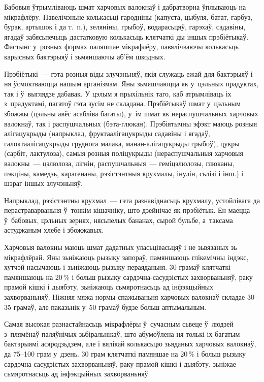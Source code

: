 Бабовыя ўтрымліваюць шмат харчовых валокнаў і дабратворна ўплываюць на мікрафлёру. Павелічэньне колькасьці гародніны (капуста, цыбуля, батат, гарбуз, бурак, артышок і да т.~п.), зеляніны, грыбоў, водарасьцяў, гарэхаў, садавіны, ягадаў забясьпечыць дастатковую колькасьць клятчаткі ды іншых прэбіётыкаў. Фастынг у~розных формах паляпшае мікрафлёру, павялічваючы колькасьць карысных бактэрыяў і зьмяншаючы аб'ём шкодных.

Прэбіётыкі~--- гэта розныя віды злучэньняў, якія служаць ежай для бактэрыяў і ня ўсмоктваюцца нашым арганізмам. Яны зьмяшчаюцца як у~цэльных прадуктах, так і ў~выглядзе дабавак. У цэлым я прыхільнік таго, каб атрымліваць іх з~прадуктамі, пагатоў гэта зусім не складана. Прэбіётыкаў шмат у~цэльным збожжы (цэльны авёс асабліва багаты), у~ім шмат як нераспушчальных харчовых валокнаў, так і распушчальных (бэта-глюкан). Прэбіятычны эфэкт маюць розныя алігацукрыды (напрыклад, фруктаалігацукрыды садавіны і ягадаў, галоктаалігацукрыды груднога малака, манан-алігацукрыды грыбоў), цукры (сарбіт, лактулоза), самыя розныя поліцукрыды (нераспушчальныя харчовыя валокны~--- цэлюлоза, лігнін, распушчальныя~--- геміцэлюлозы, глюканы, пэкціны, камедзь, карагенаны, рэзістэнтныя крухмалы, інулін, сьлізі і інш.) і шэраг іншых злучэньняў.

Напрыклад, рэзістэнтны крухмал~--- гэта разнавіднасьць крухмалу, устойлівага да перастраварваньня ў~тонкім кішачніку, што дзейнічае як прэбіётык. Ён маецца ў~бабовых, цэльных зернях, нясьпелых бананах, сырой бульбе, а~таксама астуджаным хлебе і збожжавых.

Харчовыя валокны маюць шмат дадатных уласьцівасьцяў і не зьвязаных зь мікрафлёрай. Яны зьніжаюць рызыку запораў, памяншаюць глікемічны індэкс, хутчэй насычаюць і зьніжаюць рызыку пераяданьня. 30 грамаў клятчаткі памяншаюць на 20\,\% і больш рызыку сардэчна-сасудзістых захворваньняў, раку прамой кішкі і дыябэту, зьніжаюць сьмяротнасьць ад інфэкцыйных захворваньняў. Ніжняя мяжа нормы спажываньня харчовых валокнаў складае 30--35 грамаў, але паказьнік у~50 грамаў будзе больш аптымальным.

Самая высокая разнастайнасьць мікрафлёры ў~сучасным сьвеце ў~людзей з~плямёнаў паляўнічых-зьбіральнікаў, што абумоўлена ня толькі іх багатым бактэрыямі асяродзьдзем, але і вялікай колькасьцю зьяданых харчовых валокнаў, да 75--100 грам у~дзень. 30 грам клятчаткі памяншае на 20\,\% і больш рызыку сардэчна-сасудзістых захворваньняў, раку прамой кішкі і дыябэту, зьніжае сьмяротнасьць ад інфэкцыйных захворваньняў.

